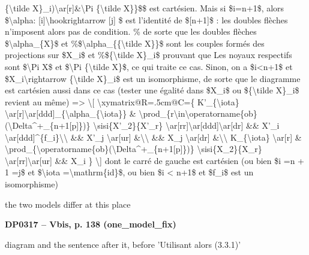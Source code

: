 \{\textbackslash{}tilde X\}\_i)\textbackslash{}ar[r]\&\textbackslash{}Pi \{\textbackslash{}tilde X\}\}\$\$ est cartésien. Mais si \$i=\allowbreak n+1\$, alors \$\textbackslash{}alpha: [i]\textbackslash{}hookrightarrow [j] \$ est l'identité de \$[n+1]\$ : les doubles flèches n'imposent alors pas de condition. \% de sorte que les doubles flèches \$\textbackslash{}alpha\_\{X\}\$ et \%\$\textbackslash{}alpha\_\{\{\textbackslash{}tilde X\}\}\$ sont les couples formés des projections sur \$X\_i\$ et \%\$\{\textbackslash{}tilde X\}\_i\$ prouvant que Les noyaux respectifs sont \$\textbackslash{}Pi X\$ et \$\textbackslash{}Pi \{\textbackslash{}tilde X\}\$, ce qui traite ce cas. Sinon, on a \$i<n+1\$ et \$X\_i\textbackslash{}rightarrow \{\textbackslash{}tilde X\}\_i\$ est un isomorphisme, de sorte que le diagramme est cartésien aussi dans ce cas (tester une égalité dans \$X\_i\$ ou \$\{\textbackslash{}tilde X\}\_i\$ revient au même) =\allowbreak > \textbackslash{}[ \textbackslash{}xymatrix@R=\allowbreak .5cm@C=\allowbreak 1.5cm\{ K'\_\{\textbackslash{}iota\} \textbackslash{}ar[r]\textbackslash{}ar[ddd]\_\{\textbackslash{}alpha\_\{\textbackslash{}iota\}\} \& \textbackslash{}prod\_\{r\textbackslash{}in\textbackslash{}operatorname\{ob\}(\textbackslash{}Delta\textasciicircum{}+\_\{n+1[p]\})\} \textbackslash{}sisi\{X'\_2\}\{X'\_r\} \textbackslash{}ar[rr]\textbackslash{}ar[ddd]\textbackslash{}ar[dr] \&\& X'\_i \textbackslash{}ar[ddd]\textasciicircum{}\{f\_i\}\textbackslash{}\textbackslash{} \&\& X'\_j \textbackslash{}ar[ur] \&\textbackslash{}\textbackslash{} \&\& X\_j \textbackslash{}ar[dr] \&\textbackslash{}\textbackslash{} K\_\{\textbackslash{}iota\} \textbackslash{}ar[r] \& \textbackslash{}prod\_\{\textbackslash{}operatorname\{ob\}(\textbackslash{}Delta\textasciicircum{}+\_\{n+1[p]\})\} \textbackslash{}sisi\{X\_2\}\{X\_r\} \textbackslash{}ar[rr]\textbackslash{}ar[ur] \&\& X\_i \} \textbackslash{}] dont le carré de gauche est cartésien (ou bien \$i =\allowbreak  n + 1 =\allowbreak j\$ et \$\textbackslash{}iota =\allowbreak  \textbackslash{}mathrm\{id\}\$, ou bien \$i < n+1\$ et \$f\_i\$ est un isomorphisme)\par
the two models differ at this place\par
\par\noindent\hypertarget{DP0317}{}\textbf{DP0317 -- Vbis, p. 138 (one\_model\_fix)}\par
diagram and the sentence after it, before 'Utilisant alors (3.3.1)'\par
